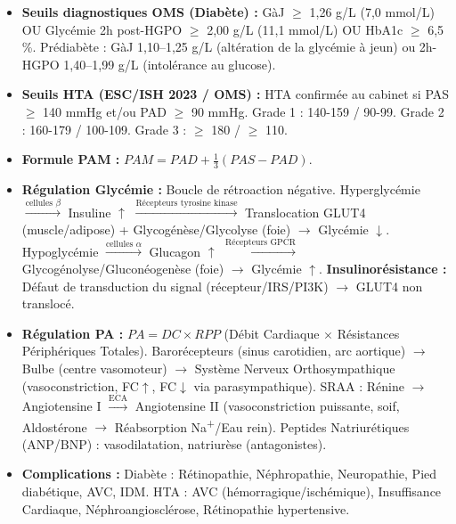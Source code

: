 \documentclass[11pt]{article}
\newcounter{popsec}
\newcounter{popsub}
\newcommand{\courssub}[1]{%
  \stepcounter{popsub}%
  \par\vspace{9pt}\noindent{\popxbold\fontsize{11.5}{13}\selectfont\color{popink}{\color{poporange}\thepopsec.\thepopsub}\hspace{6pt}#1}\par\nopagebreak\vspace{4pt}
}
\begin{document}
\courssub{Ressources à mobiliser}
\begin{itemize}
    \item \textbf{Seuils diagnostiques OMS (Diabète) :} GàJ $\ge$ 1,26 g/L (7,0 mmol/L) OU Glycémie 2h post-HGPO $\ge$ 2,00 g/L (11,1 mmol/L) OU HbA1c $\ge$ 6,5 \%. Prédiabète : GàJ 1,10--1,25 g/L (altération de la glycémie à jeun) ou 2h-HGPO 1,40--1,99 g/L (intolérance au glucose).
    \item \textbf{Seuils HTA (ESC/ISH 2023 / OMS) :} HTA confirmée au cabinet si PAS $\ge$ 140 mmHg et/ou PAD $\ge$ 90 mmHg. Grade 1 : 140-159 / 90-99. Grade 2 : 160-179 / 100-109. Grade 3 : $\ge$ 180 / $\ge$ 110.
    \item \textbf{Formule PAM :} $PAM = PAD + \frac{1}{3}(PAS - PAD)$.
    \item \textbf{Régulation Glycémie :} Boucle de rétroaction négative. Hyperglycémie $\xrightarrow{\text{cellules }\beta}$ Insuline $\uparrow$ $\xrightarrow{\text{Récepteurs tyrosine kinase}}$ Translocation GLUT4 (muscle/adipose) + Glycogénèse/Glycolyse (foie) $\rightarrow$ Glycémie $\downarrow$. Hypoglycémie $\xrightarrow{\text{cellules }\alpha}$ Glucagon $\uparrow$ $\xrightarrow{\text{Récepteurs GPCR}}$ Glycogénolyse/Gluconéogenèse (foie) $\rightarrow$ Glycémie $\uparrow$. \textbf{Insulinorésistance :} Défaut de transduction du signal (récepteur/IRS/PI3K) $\rightarrow$ GLUT4 non translocé.
    \item \textbf{Régulation PA :} $PA = DC \times RPP$ (Débit Cardiaque $\times$ Résistances Périphériques Totales). Barorécepteurs (sinus carotidien, arc aortique) $\rightarrow$ Bulbe (centre vasomoteur) $\rightarrow$ Système Nerveux Orthosympathique (vasoconstriction, FC$\uparrow$, FC$\downarrow$ via parasympathique). SRAA : Rénine $\rightarrow$ Angiotensine I $\xrightarrow{\text{ECA}}$ Angiotensine II (vasoconstriction puissante, soif, Aldostérone $\rightarrow$ Réabsorption Na\textsuperscript{+}/Eau rein). Peptides Natriurétiques (ANP/BNP) : vasodilatation, natriurèse (antagonistes).
    \item \textbf{Complications :} Diabète : Rétinopathie, Néphropathie, Neuropathie, Pied diabétique, AVC, IDM. HTA : AVC (hémorragique/ischémique), Insuffisance Cardiaque, Néphroangiosclérose, Rétinopathie hypertensive.
\end{itemize}
\end{document}
